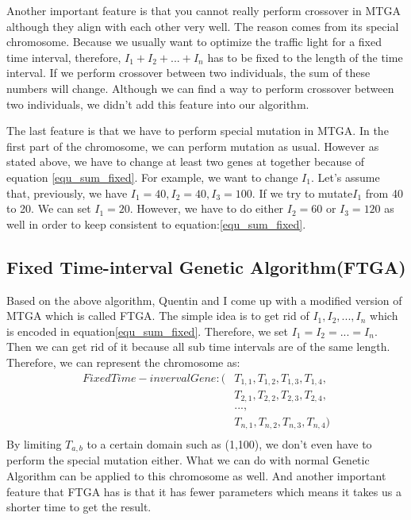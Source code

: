 \documentclass{article} %
\begin{document}
Another important feature is that you cannot really perform crossover in MTGA although they align with each other very well. The reason comes from its special chromosome. Because we usually want to optimize the traffic light for a fixed time interval, therefore, $I_1 + I_2 + ... + I_n$ has to be fixed to the length of the time interval. If we perform crossover between two individuals, the sum of these numbers will change. Although we can find a way to perform crossover between two individuals, we didn't add this feature into our algorithm.

The last feature is that we have to perform special mutation in MTGA. In the first part of the chromosome, we can perform mutation as usual. However as stated above, we have to change at least two genes at together because of equation \ref{equ_sum_fixed}. For example, we want to change ${I_1}$. Let's assume that, previously, we have $I_1 = 40, I_2 = 40, I_3 = 100$. If we try to mutate$I_1$ from 40 to 20. We can set $I_1 = 20$. However, we have to do either $I_2=60$ or $I_3=120$ as well in order to keep consistent to equation:\ref{equ_sum_fixed}. 


\subsection{Fixed Time-interval Genetic Algorithm(FTGA)}
Based on the above algorithm, Quentin and I come up with a modified version of MTGA which is called FTGA. The simple idea is to get rid of $I_1, I_2, ..., I_n$ which is encoded in equation\ref{equ_sum_fixed}. Therefore, we set $I_1=I_2=...=I_n$. Then we can get rid of it because all sub time intervals are of the same length. Therefore, we can represent the chromosome as:
\begin{align}
Fixed Time-inverval Gene:
(&T_{1,1}, T_{1,2}, T_{1,3}, T_{1,4},\\
&T_{2,1}, T_{2,2}, T_{2,3}, T_{2,4},\\
&...,\\
&T_{n,1}, T_{n, 2}, T_{n,3}, T_{n, 4})\\
\end{align}
By limiting $T_{a,b}$ to a certain domain such as (1,100), we don't even have to perform the special mutation either. What we can do with normal Genetic Algorithm can be applied to this chromosome as well. And another important feature that FTGA has is that it has fewer parameters which means it takes us a shorter time to get the result. 
\end{document}
